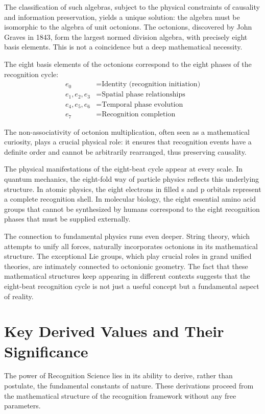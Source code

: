 \documentclass[12pt,a4paper]{report}
\begin{document}
The classification of such algebras, subject to the physical constraints of causality and information preservation, yields a unique solution: the algebra must be isomorphic to the algebra of unit octonions. The octonions, discovered by John Graves in 1843, form the largest normed division algebra, with precisely eight basis elements. This is not a coincidence but a deep mathematical necessity.

The eight basis elements of the octonions correspond to the eight phases of the recognition cycle:
\begin{align}
e_0 &= \text{Identity (recognition initiation)} \\
e_1, e_2, e_3 &= \text{Spatial phase relationships} \\
e_4, e_5, e_6 &= \text{Temporal phase evolution} \\
e_7 &= \text{Recognition completion}
\end{align}

The non-associativity of octonion multiplication, often seen as a mathematical curiosity, plays a crucial physical role: it ensures that recognition events have a definite order and cannot be arbitrarily rearranged, thus preserving causality.

The physical manifestations of the eight-beat cycle appear at every scale. In quantum mechanics, the eight-fold way of particle physics reflects this underlying structure. In atomic physics, the eight electrons in filled s and p orbitals represent a complete recognition shell. In molecular biology, the eight essential amino acid groups that cannot be synthesized by humans correspond to the eight recognition phases that must be supplied externally.

The connection to fundamental physics runs even deeper. String theory, which attempts to unify all forces, naturally incorporates octonions in its mathematical structure. The exceptional Lie groups, which play crucial roles in grand unified theories, are intimately connected to octonionic geometry. The fact that these mathematical structures keep appearing in different contexts suggests that the eight-beat recognition cycle is not just a useful concept but a fundamental aspect of reality.

\section{Key Derived Values and Their Significance}

The power of Recognition Science lies in its ability to derive, rather than postulate, the fundamental constants of nature. These derivations proceed from the mathematical structure of the recognition framework without any free parameters.
\end{document}
